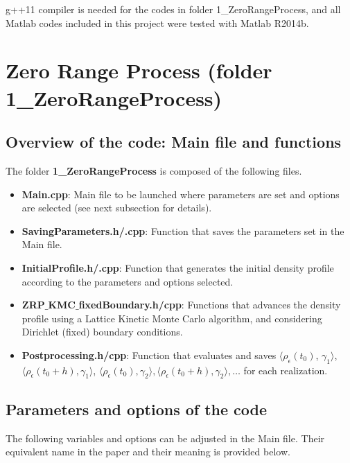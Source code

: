 \documentclass[authoryear,3p,11pt]{elsarticle}
\begin{document}
g++11 compiler is needed for the codes in folder 1\_ZeroRangeProcess, and all Matlab codes included in this project were tested with Matlab R2014b.

\section{Zero Range Process (folder 1\_ZeroRangeProcess)} \label{Sec:ZRP}

\subsection{Overview of the code: Main file and functions} 


The folder {\bf 1\_ZeroRangeProcess} is composed of the following files.
\begin{itemize}
\item {\bf Main.cpp}: Main file to be launched where parameters are set and options are selected (see next subsection for details).
\item {\bf SavingParameters.h/.cpp}: Function that saves the parameters set in the Main file.
\item {\bf InitialProfile.h/.cpp}: Function that generates the initial density profile according to the parameters and options selected.
\item {\bf ZRP$\_$KMC$\_$fixedBoundary.h/cpp}: Functions that advances the density profile using a Lattice Kinetic Monte Carlo algorithm, and considering Dirichlet (fixed) boundary conditions.
\item {\bf Postprocessing.h/cpp}: Function that evaluates and saves $\langle \rho_{\epsilon}(t_0)$, $\gamma_1 \rangle$, $\langle \rho_{\epsilon}(t_0+h),\gamma_1 \rangle$, $\langle \rho_{\epsilon}(t_0),\gamma_2 \rangle, \langle \rho_{\epsilon}(t_0+h),\gamma_2 \rangle, \ldots$ for each realization.
\end{itemize}


\subsection{Parameters and options of the code} 


The following variables and options can be adjusted in the Main file. Their equivalent name in the paper and their meaning is provided below.
\end{document}
